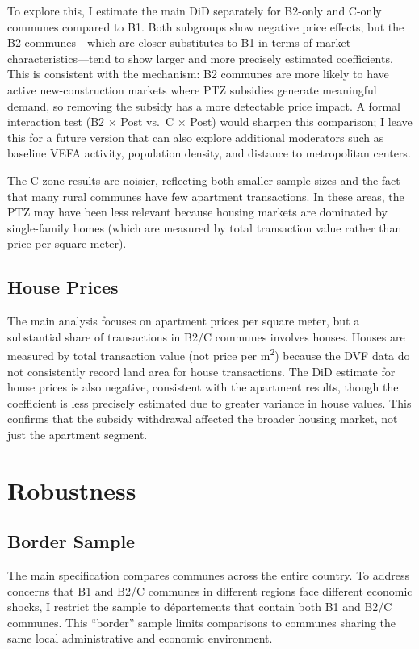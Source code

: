 \documentclass[12pt]{article}
\begin{document}
To explore this, I estimate the main DiD separately for B2-only and C-only communes compared to B1. Both subgroups show negative price effects, but the B2 communes---which are closer substitutes to B1 in terms of market characteristics---tend to show larger and more precisely estimated coefficients. This is consistent with the mechanism: B2 communes are more likely to have active new-construction markets where PTZ subsidies generate meaningful demand, so removing the subsidy has a more detectable price impact. A formal interaction test (B2 $\times$ Post vs.\ C $\times$ Post) would sharpen this comparison; I leave this for a future version that can also explore additional moderators such as baseline VEFA activity, population density, and distance to metropolitan centers.

The C-zone results are noisier, reflecting both smaller sample sizes and the fact that many rural communes have few apartment transactions. In these areas, the PTZ may have been less relevant because housing markets are dominated by single-family homes (which are measured by total transaction value rather than price per square meter).

\subsection{House Prices}

The main analysis focuses on apartment prices per square meter, but a substantial share of transactions in B2/C communes involves houses. Houses are measured by total transaction value (not price per m\textsuperscript{2}) because the DVF data do not consistently record land area for house transactions. The DiD estimate for house prices is also negative, consistent with the apartment results, though the coefficient is less precisely estimated due to greater variance in house values. This confirms that the subsidy withdrawal affected the broader housing market, not just the apartment segment.


\section{Robustness}

\subsection{Border Sample}

The main specification compares communes across the entire country. To address concerns that B1 and B2/C communes in different regions face different economic shocks, I restrict the sample to d\'{e}partements that contain both B1 and B2/C communes. This ``border'' sample limits comparisons to communes sharing the same local administrative and economic environment.
\end{document}
